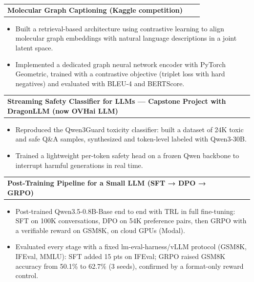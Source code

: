 \documentclass[a4paper,10pt]{article}
\makeatletter
\newenvironment{project}[2]
    {
    \begin{tabularx}{\linewidth}{@{}l X r@{}}
    \textbf{#1} & \hfill & #2
    \end{tabularx}
    \begin{minipage}[t]{\linewidth}
    \begin{itemize}[nosep,after=\strut, leftmargin=1em, itemsep=0pt,label=--]
    }
    {
    \end{itemize}
    \end{minipage}
    }
\makeatother
\begin{document}
\begin{project}{Molecular Graph Captioning (Kaggle competition)}
{\href{https://github.com/maxencedbe/molecular_graph_captioning}{\textcolor{black}{\raisebox{-0.05\height}{\large \faGithub}}}}
    \item Built a retrieval-based architecture using contrastive learning to align molecular graph embeddings with natural language descriptions in a joint latent space.
    \item Implemented a dedicated graph neural network encoder with PyTorch Geometric, trained with a contrastive objective (triplet loss with hard negatives) and evaluated with BLEU-4 and BERTScore.
\end{project}\vspace{-6pt}

\begin{project}{Streaming Safety Classifier for LLMs --- Capstone Project with DragonLLM (now OVHai LLM)}
{\href{https://github.com/maxencedbe/capstone_dragonllm}{\textcolor{black}{\raisebox{-0.05\height}{\large \faGithub}}}}
    \item Reproduced the Qwen3Guard toxicity classifier: built a dataset of 24K toxic and safe Q\&A samples, synthesized and token-level labeled with Qwen3-30B.
    \item Trained a lightweight per-token safety head on a frozen Qwen backbone to interrupt harmful generations in real time.
\end{project}\vspace{-6pt}

\begin{project}{Post-Training Pipeline for a Small LLM (SFT → DPO → GRPO)}
{\href{https://github.com/maxencedbe/small-llm-post-training}{\textcolor{black}{\raisebox{-0.05\height}{\large \faGithub}}}}
    \item Post-trained Qwen3.5-0.8B-Base end to end with TRL in full fine-tuning: SFT on 100K conversations, DPO on 54K preference pairs, then GRPO with a verifiable reward on GSM8K, on cloud GPUs (Modal).
    \item Evaluated every stage with a fixed lm-eval-harness/vLLM protocol (GSM8K, IFEval, MMLU): SFT added 15 pts on IFEval; GRPO raised GSM8K accuracy from 50.1\% to 62.7\% (3 seeds), confirmed by a format-only reward control.
\end{project} \\[-16pt]

\end{document}

